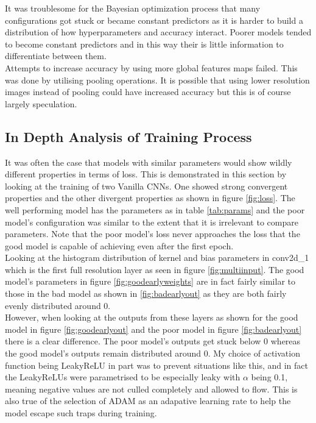 \documentclass{article}
\begin{document}
It was troublesome for the Bayesian optimization process that many configurations got stuck or became constant predictors as it is harder to build a distribution of how hyperparameters and accuracy interact. Poorer models tended to become constant predictors and in this way their is little information to differentiate between them. \\

Attempts to increase accuracy by using more global features maps failed. This was done by utilising pooling operations. It is possible that using lower resolution images instead of pooling could have increased accuracy but this is of course largely speculation. \\


\subsection{In Depth Analysis of Training Process}
It was often the case that models with similar parameters would show wildly different properties in terms of loss. This is demonstrated in this section by looking at the training of two Vanilla CNNs. One showed strong convergent properties and the other divergent properties as shown in figure \ref{fig:loss}. The well performing model has the parameters as in table \ref{tab:params} and the poor model's configuration was similar to the extent that it is irrelevant to compare parameters. Note that the poor model's loss never approaches the loss that the good model is capable of achieving even after the first epoch.\\

Looking at the histogram distribution of kernel and bias parameters in conv2d\_1 which is the first full resolution layer as seen in figure \ref{fig:multiinput}. The good model's parameters in figure \ref{fig:goodearlyweights} are in fact fairly similar to those in the bad model as shown in \ref{fig:badearlyout} as they are both fairly evenly distributed around 0. \\

However, when looking at the outputs from these layers as shown for the good model in figure \ref{fig:goodearlyout} and the poor model in figure \ref{fig:badearlyout} there is a clear difference. The poor model's outputs get stuck below 0 whereas the good model's outputs remain distributed around 0. My choice of activation function being LeakyReLU in part was to prevent situations like this, and in fact the LeakyReLUs were parametrised to be especially leaky with $\alpha$ being 0.1, meaning negative values are not culled completely and allowed to flow. This is also true of the selection of ADAM as an adapative learning rate to help the model escape such traps during training.\\
\end{document}
